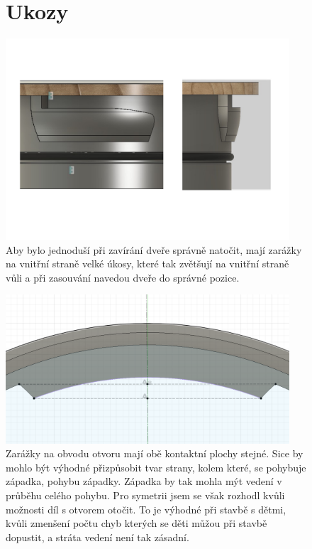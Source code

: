 
\begin{figure}[htbp]
    \section*{Ukozy}
    \centering
    \includegraphics[width=400]{kapitoly/obrazky/E4/ukozy/ukladaci_ukosy.pdf}
    \caption{Aby bylo jednoduší při zavírání dveře správně natočit, mají zarážky na vnitřní straně velké úkosy, které tak zvětšují na vnitřní straně vůli a při zasouvání navedou dveře do správné pozice.}

    \label{fig:ukosy}
\end{figure}

\begin{figure}[htbp]
    \centering
    \includegraphics[width=400]{kapitoly/obrazky/E4/ukozy/simetrie_zarazek.png}
    \caption{Zarážky na obvodu otvoru mají obě kontaktní plochy stejné. Sice by mohlo být výhodné přizpůsobit tvar strany, kolem které, se pohybuje západka, 
pohybu západky. Západka by tak mohla mýt vedení v průběhu celého pohybu. Pro symetrii jsem se však rozhodl kvůli možnosti díl s otvorem otočit.
To je výhodné při stavbě s dětmi, kvůli zmenšení počtu chyb kterých se děti můžou při stavbě dopustit, a stráta vedení není tak zásadní.}
    \label{fig:ukosy}
\end{figure}

\clearpage
\newpage